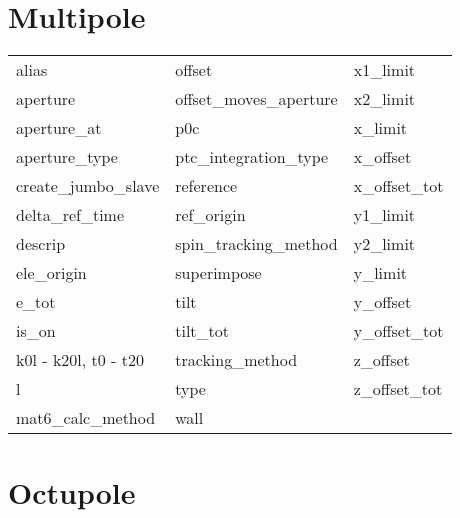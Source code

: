  \section{Multipole}
 \label{s:list.multipole}
 
 \begin{tabular}{lll} \toprule
alias                       & offset                      & x1_limit                    \\
aperture                    & offset_moves_aperture       & x2_limit                    \\
aperture_at                 & p0c                         & x_limit                     \\
aperture_type               & ptc_integration_type        & x_offset                    \\
create_jumbo_slave          & reference                   & x_offset_tot                \\
delta_ref_time              & ref_origin                  & y1_limit                    \\
descrip                     & spin_tracking_method        & y2_limit                    \\
ele_origin                  & superimpose                 & y_limit                     \\
e_tot                       & tilt                        & y_offset                    \\
is_on                       & tilt_tot                    & y_offset_tot                \\
k0l - k20l, t0 - t20        & tracking_method             & z_offset                    \\
l                           & type                        & z_offset_tot                \\
mat6_calc_method            & wall                        &                             \\
 \bottomrule
 \end{tabular}
 \vfill
 
 \section{Octupole}
 \label{s:list.octupole}
 
